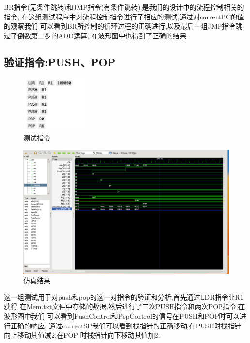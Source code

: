 \documentclass{article}
\begin{document}
BR指令(无条件跳转)和JMP指令(有条件跳转),是我们的设计中的流程控制相关的指令,
在这组测试程序中对流程控制指令进行了相应的测试,通过对currentPC的值的观察我们
可以看到BR所控制的循环过程的正确进行,以及最后一组JMP指令跳过了倒数第二步的ADD运算,
在波形图中也得到了正确的结果.



\subsection{验证指令:PUSH、POP}

\begin{figure}[H]
\centering
\includegraphics[width=0.3\textwidth]{pic/2.png}
\caption{\label{pr}测试指令}
\end{figure}
    
\begin{figure}[H]
    \centering
    \includegraphics[width=1.2\textwidth]{pic/1.png}
    \caption{\label{pr}仿真结果}
    \end{figure}
    









这一组测试用于对push和pop的这一对指令的验证和分析,首先通过LDR指令让R1获得
在Mem.txt文件中存储的数据,然后进行了三次PUSH指令和两次POP指令,在波形图中我们
可以看到PushControl和PopControl的信号在PUSH和POP时可以进行正确的响应,
通过currentSP我们可以看到栈指针的正确移动,在PUSH时栈指针向上移动其值减2,在POP
时栈指针向下移动其值加2.
\end{document}
